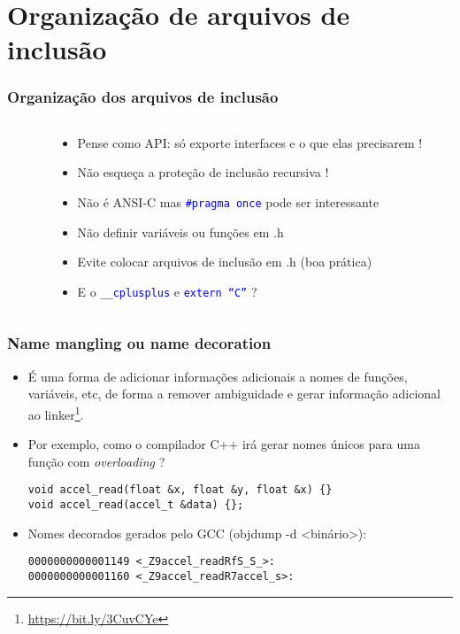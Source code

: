 \documentclass{beamer}
\begin{document}
\section{Organização de arquivos de inclusão}
	
\begin{frame}
	\frametitle{Organização dos arquivos de inclusão}
	\begin{columns}[T] %
		\begin{column}{.450\textwidth}
			
		\end{column}%
		\hfill%
		\begin{column}{.55\textwidth}
			\begin{itemize}
				\item Pense como API: só exporte interfaces e o que elas precisarem !
				\item Não esqueça a proteção de inclusão recursiva !
				\item Não é ANSI-C mas \texttt{\textcolor{blue}{\#pragma once}} pode ser interessante
				\item Não definir variáveis ou funções em .h
				\item Evite colocar arquivos de inclusão em .h (boa prática)
                \item E o \texttt{\textcolor{blue}{\_\_cplusplus}} e \texttt{\textcolor{blue}{extern ``C''}} ?
			\end{itemize}
		\end{column}%
	\end{columns}
\end{frame}

\begin{frame}[fragile]
	\frametitle{Name mangling ou name decoration}
		\begin{itemize}
			\item É uma forma de adicionar informações adicionais a nomes de funções, variáveis, etc, de forma a remover ambiguidade e gerar informação adicional ao linker\footnote{{\tiny\url{ https://bit.ly/3CuvCYe}}}.
			\item Por exemplo, como o compilador C++ irá gerar nomes únicos para uma função com \textit{overloading} ?
            	\begin{lstlisting}[style=customc]
void accel_read(float &x, float &y, float &x) {}
void accel_read(accel_t &data) {};
            	\end{lstlisting}
               \item Nomes decorados gerados pelo GCC (objdump -d <binário>):
            	\begin{lstlisting}[style=customc]
0000000000001149 <_Z9accel_readRfS_S_>:
0000000000001160 <_Z9accel_readR7accel_s>:
            	\end{lstlisting}
		\end{itemize}
\end{frame}
\end{document}
